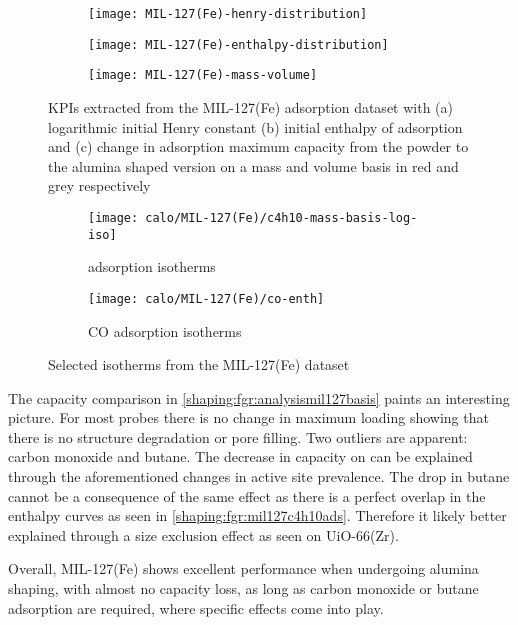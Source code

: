 \begin{figure}[p!]
	\centering
	\begin{subfigure}{\linewidth}
		\parbox[c]{0.1\linewidth}{\caption{}%
			\label{shaping:fgr:analysismil127henry}}%
		\parbox[b]{0.8\linewidth}{%
			\texttt{[image: MIL-127(Fe)-henry-distribution]}%
		}%
	\end{subfigure}%

	\begin{subfigure}{\linewidth}
		\parbox[c]{0.1\linewidth}{\caption{}%
			\label{shaping:fgr:analysismil127enth}}%
		\parbox[b]{0.8\linewidth}{%
			\texttt{[image: MIL-127(Fe)-enthalpy-distribution]}%
		}%
	\end{subfigure}%

	\begin{subfigure}{\linewidth}
		\parbox[c]{0.1\linewidth}{\caption{}%
			\label{shaping:fgr:analysismil127basis}}%
		\parbox[b]{0.8\linewidth}{%
			\texttt{[image: MIL-127(Fe)-mass-volume]}%
		}%
	\end{subfigure}%

	\caption{KPIs extracted from the MIL-127(Fe) adsorption dataset with
		(a) logarithmic initial Henry constant (b) initial enthalpy of
        adsorption and (c) change in adsorption maximum capacity from 
        the powder to the alumina shaped version on a mass and volume 
        basis in red and grey respectively}%
	\label{shaping:fgr:analysismil127}
\end{figure}

\begin{figure}[!htb]
	\centering
	\begin{subfigure}{0.45\textwidth}
		\texttt{[image: calo/MIL-127(Fe)/c4h10-mass-basis-log-iso]}
		\caption{ adsorption isotherms}%
		\label{shaping:fgr:mil127c4h10ads}
	\end{subfigure}%
	\begin{subfigure}{0.45\textwidth}
		\texttt{[image: calo/MIL-127(Fe)/co-enth]}
		\caption{CO adsorption isotherms}%
		\label{shaping:fgr:mil127coads}
	\end{subfigure}%
	\caption{Selected isotherms from the MIL-127(Fe) dataset}%
	\label{shaping:fgr:mil127isotherms}
\end{figure}

The capacity comparison in \autoref{shaping:fgr:analysismil127basis}
paints an interesting picture. For most probes there is no change in
maximum loading showing that there is no structure degradation or
pore filling. Two outliers are apparent: carbon monoxide and
butane. The decrease in capacity on  can be explained through the
aforementioned changes in active site prevalence.
The drop in butane cannot be a consequence of the same effect
as there is a perfect overlap in the enthalpy curves as seen in
\autoref{shaping:fgr:mil127c4h10ads}.
Therefore it likely better explained through a size exclusion
effect as seen on UiO-66(Zr).

Overall, MIL-127(Fe) shows excellent performance when undergoing
alumina shaping, with almost no capacity loss, as long as
carbon monoxide or butane adsorption are required, where specific effects
come into play.
